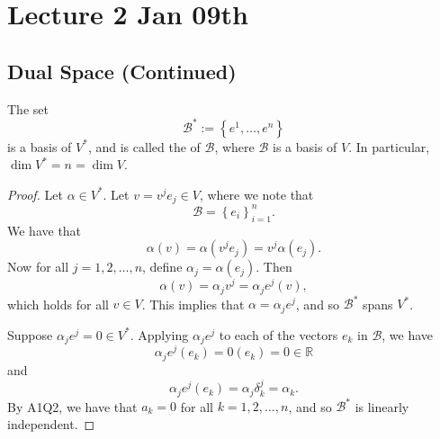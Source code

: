 \documentclass[notoc,notitlepage]{tufte-book}
\begin{document}


\chapter{Lecture 2 Jan 09th}%
\label{chp:lecture_2_jan_09th}

\section{Dual Space (Continued)}%
\label{sec:dual_space_continued}

\begin{propo}\label{propo:dual_basis}
  The set
  \begin{equation*}
    \mathcal{B}^* := \left\{ e^1, \ldots, e^n \right\}
  \end{equation*}
  is a basis of $V^*$, and is called the  of $\mathcal{B}$,
  where $\mathcal{B}$ is a basis of $V$.
  In particular, $\dim V^* = n = \dim V$.
\end{propo}

\begin{proof}
  Let $\alpha \in V^*$. Let $v = v^j e_j \in V$,
  where we note that
  \begin{equation*}
    \mathcal{B} = \left\{ e_i \right\}_{i = 1}^{n}.
  \end{equation*}
  We have that
  \begin{equation*}
    \alpha(v) = \alpha(v^j e_j) = v^j \alpha( e_j ).
  \end{equation*}
  Now for all $j = 1, 2, \ldots, n$, define $\alpha_j = \alpha(e_j)$.
  Then
  \begin{equation*}
    \alpha(v) = \alpha_j v^j = \alpha_j e^j(v),
  \end{equation*}
  which holds for all $v \in V$. This implies that $\alpha = \alpha_j e^j$,
  and so $\mathcal{B}^*$ spans $V^*$.

  \noindent
  Suppose $\alpha_j e^j = 0 \in V^*$.
  Applying $\alpha_j e^j$ to each of the vectors $e_k$ in $\mathcal{B}$, we have
  \begin{equation*}
    \alpha_j e^j(e_k) = 0(e_k) = 0 \in \mathbb{R}
  \end{equation*}
  and
  \begin{equation*}
    \alpha_j e^j(e_k) = \alpha_j \delta_k^j = \alpha_k.
  \end{equation*}
  By A1Q2, we have that $a_k = 0$ for all $k = 1, 2, \ldots, n$,
  and so $\mathcal{B}^*$ is linearly independent.
\end{proof}
\end{document}
